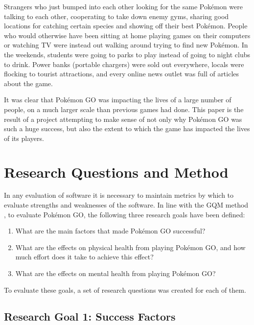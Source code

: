Strangers who just bumped into each other looking for the same Pokémon were talking to each other, cooperating to take down enemy gyms, sharing good locations for catching certain species and showing off their best Pokémon. People who would otherwise have been sitting at home playing games on their computers or watching TV were instead out walking around trying to find new Pokémon. In the weekends, students were going to parks to play instead of going to night clubs to drink.  Power banks (portable chargers) were sold out everywhere, locals were flocking to tourist attractions, and every online news outlet was full of articles about the game.

It was clear that Pokémon GO was impacting the lives of a large number of people, on a much larger scale than previous games had done. This paper is the result of a project attempting to make sense of not only why Pokémon GO was such a huge success, but also the extent to which the game has impacted the lives of its players.

\section{Research Questions and Method}

In any evaluation of software it is necessary to maintain metrics by which to evaluate strengths and weaknesses of the software. In line with the GQM method , to evaluate Pokémon GO, the following three research goals have been defined:

\begin{enumerate}
	\item What are the main factors that made Pokémon GO successful?
	\item What are the effects on physical health from playing Pokémon GO, and how much effort does it take to achieve this effect?
	\item What are the effects on mental health from playing Pokémon GO?
\end{enumerate}

To evaluate these goals, a set of research questions was created for each of them.

\subsection{Research Goal 1: Success Factors}

